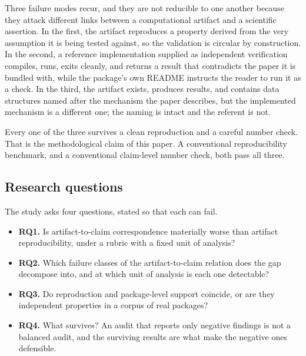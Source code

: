 \documentclass[sigconf,review]{acmart}
\begin{document}
Three failure modes recur, and they are not reducible to one another because
they attack different links between a computational artifact and a scientific
assertion. In the first, the artifact reproduces a property derived from the
very assumption it is being tested against, so the validation is circular by
construction. In the second, a reference implementation supplied as
independent verification compiles, runs, exits cleanly, and returns a result
that contradicts the paper it is bundled with, while the package's own
README instructs the reader to run it as a check. In the third, the artifact
exists, produces results, and contains data structures named after the
mechanism the paper describes, but the implemented mechanism is a different
one; the naming is intact and the referent is not.

Every one of the three survives a clean reproduction and a careful number
check. That is the methodological claim of this paper. A conventional
reproducibility benchmark, and a conventional claim-level number check, both
pass all three.

\subsection{Research questions}
\label{sec:intro-rq}

The study asks four questions, stated so that each can fail.

\begin{itemize}
\setlength{\topsep}{2pt}\setlength{\itemsep}{2pt}\setlength{\parsep}{0pt}

\item \textbf{RQ1.} Is artifact-to-claim correspondence materially worse than
      artifact reproducibility, under a rubric with a fixed unit of analysis?

\item \textbf{RQ2.} Which failure classes of the artifact-to-claim relation
      does the gap decompose into, and at which unit of analysis is each one
      detectable?

\item \textbf{RQ3.} Do reproduction and package-level support coincide, or are
      they independent properties in a corpus of real packages?

\item \textbf{RQ4.} What survives? An audit that reports only negative
      findings is not a balanced audit, and the surviving results are what
      make the negative ones defensible.

\end{itemize}
\end{document}
